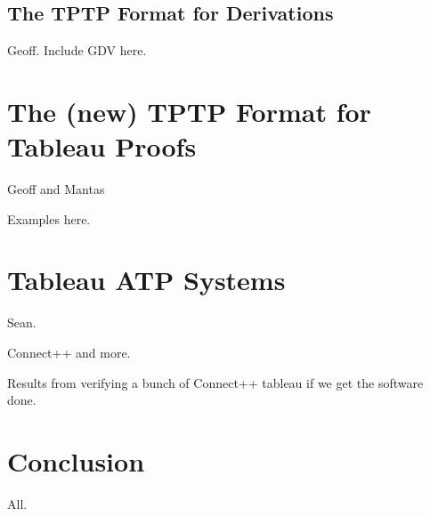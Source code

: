 \documentclass[runningheads]{llncs}
\begin{document}
\subsection{The TPTP Format for Derivations}
\label{Derivations}

Geoff. Include GDV here.

\section{The (new) TPTP Format for Tableau Proofs}
\label{Tableau}

Geoff and Mantas

Examples here.


\section{Tableau ATP Systems}
\label{ATPSystems}

Sean.

Connect++ and more.

Results from verifying a bunch of Connect++ tableau if we get the software done.

\section{Conclusion}
\label{Conclusion}

All.



\end{document}
